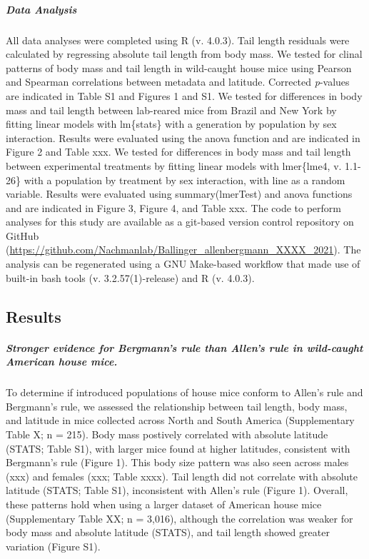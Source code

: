 \documentclass[]{article}
\let\oldsubparagraph\subparagraph
\renewcommand{\subparagraph}[1]{\oldsubparagraph{#1}\mbox{}}
\begin{document}
\hypertarget{data-analysis}{%
\subparagraph{\texorpdfstring{\emph{Data
Analysis}}{Data Analysis}}\label{data-analysis}}

All data analyses were completed using R (v. 4.0.3). Tail length
residuals were calculated by regressing absolute tail length from body
mass. We tested for clinal patterns of body mass and tail length in
wild-caught house mice using Pearson and Spearman correlations between
metadata and latitude. Corrected \emph{p}-values are indicated in Table
S1 and Figures 1 and S1. We tested for differences in body mass and tail
length between lab-reared mice from Brazil and New York by fitting
linear models with lm\{stats\} with a generation by population by sex
interaction. Results were evaluated using the anova function and are
indicated in Figure 2 and Table xxx. We tested for differences in body
mass and tail length between experimental treatments by fitting linear
models with lmer\{lme4, v. 1.1-26\} with a population by treatment by
sex interaction, with line as a random variable. Results were evaluated
using summary(lmerTest) and anova functions and are indicated in Figure
3, Figure 4, and Table xxx. The code to perform analyses for this study
are available as a git-based version control repository on GitHub
(\url{https://github.com/Nachmanlab/Ballinger_allenbergmann_XXXX_2021}).
The analysis can be regenerated using a GNU Make-based workflow that
made use of built-in bash tools (v. 3.2.57(1)-release) and R (v. 4.0.3).

\newpage

\hypertarget{results}{%
\subsection{Results}\label{results}}

\hypertarget{stronger-evidence-for-bergmanns-rule-than-allens-rule-in-wild-caught-american-house-mice.}{%
\subparagraph{\texorpdfstring{\emph{Stronger evidence for Bergmann's
rule than Allen's rule in wild-caught American house
mice.}}{Stronger evidence for Bergmann's rule than Allen's rule in wild-caught American house mice.}}\label{stronger-evidence-for-bergmanns-rule-than-allens-rule-in-wild-caught-american-house-mice.}}

To determine if introduced populations of house mice conform to Allen's
rule and Bergmann's rule, we assessed the relationship between tail
length, body mass, and latitude in mice collected across North and South
America (Supplementary Table X; n = 215). Body mass postively correlated
with absolute latitude (STATS; Table S1), with larger mice found at
higher latitudes, consistent with Bergmann's rule (Figure 1). This body
size pattern was also seen across males (xxx) and females (xxx; Table
xxxx). Tail length did not correlate with absolute latitude (STATS;
Table S1), inconsistent with Allen's rule (Figure 1). Overall, these
patterns hold when using a larger dataset of American house mice
(Supplementary Table XX; n = 3,016), although the correlation was weaker
for body mass and absolute latitude (STATS), and tail length showed
greater variation (Figure S1).
\end{document}
